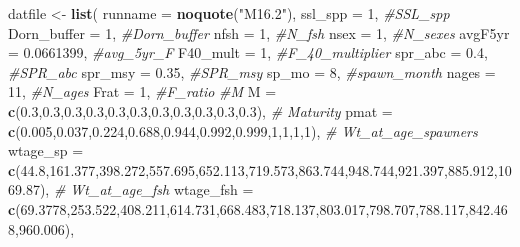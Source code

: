 \documentclass[]{article}
\newenvironment{Shaded}{\begin{snugshade}}{\end{snugshade}}
\newcommand{\CommentTok}[1]{\textcolor[rgb]{0.56,0.35,0.01}{\textit{#1}}}
\newcommand{\DataTypeTok}[1]{\textcolor[rgb]{0.13,0.29,0.53}{#1}}
\newcommand{\DecValTok}[1]{\textcolor[rgb]{0.00,0.00,0.81}{#1}}
\newcommand{\FloatTok}[1]{\textcolor[rgb]{0.00,0.00,0.81}{#1}}
\newcommand{\KeywordTok}[1]{\textcolor[rgb]{0.13,0.29,0.53}{\textbf{#1}}}
\newcommand{\NormalTok}[1]{#1}
\newcommand{\StringTok}[1]{\textcolor[rgb]{0.31,0.60,0.02}{#1}}
\begin{document}
\begin{Shaded}
\begin{Highlighting}[]
\NormalTok{datfile \textless{}{-}}\StringTok{ }\KeywordTok{list}\NormalTok{(}
  \DataTypeTok{runname     =} \KeywordTok{noquote}\NormalTok{(}\StringTok{"M16.2"}\NormalTok{), }
  \DataTypeTok{ssl\_spp     =} \DecValTok{1}\NormalTok{,         }\CommentTok{\#SSL\_spp}
  \DataTypeTok{Dorn\_buffer =} \DecValTok{1}\NormalTok{,         }\CommentTok{\#Dorn\_buffer}
  \DataTypeTok{nfsh        =} \DecValTok{1}\NormalTok{,         }\CommentTok{\#N\_fsh}
  \DataTypeTok{nsex        =} \DecValTok{1}\NormalTok{,         }\CommentTok{\#N\_sexes}
  \DataTypeTok{avgF5yr     =} \FloatTok{0.0661399}\NormalTok{, }\CommentTok{\#avg\_5yr\_F}
  \DataTypeTok{F40\_mult    =} \DecValTok{1}\NormalTok{,         }\CommentTok{\#F\_40\_multiplier}
  \DataTypeTok{spr\_abc     =} \FloatTok{0.4}\NormalTok{,       }\CommentTok{\#SPR\_abc}
  \DataTypeTok{spr\_msy     =} \FloatTok{0.35}\NormalTok{,      }\CommentTok{\#SPR\_msy}
  \DataTypeTok{sp\_mo       =} \DecValTok{8}\NormalTok{,         }\CommentTok{\#spawn\_month}
  \DataTypeTok{nages       =} \DecValTok{11}\NormalTok{,        }\CommentTok{\#N\_ages}
  \DataTypeTok{Frat        =} \DecValTok{1}\NormalTok{,         }\CommentTok{\#F\_ratio}
    \CommentTok{\#M}
    \DataTypeTok{M    =} \KeywordTok{c}\NormalTok{(}\FloatTok{0.3}\NormalTok{,}\FloatTok{0.3}\NormalTok{,}\FloatTok{0.3}\NormalTok{,}\FloatTok{0.3}\NormalTok{,}\FloatTok{0.3}\NormalTok{,}\FloatTok{0.3}\NormalTok{,}\FloatTok{0.3}\NormalTok{,}\FloatTok{0.3}\NormalTok{,}\FloatTok{0.3}\NormalTok{,}\FloatTok{0.3}\NormalTok{,}\FloatTok{0.3}\NormalTok{), }
    \CommentTok{\# Maturity}
    \DataTypeTok{pmat =} \KeywordTok{c}\NormalTok{(}\FloatTok{0.005}\NormalTok{,}\FloatTok{0.037}\NormalTok{,}\FloatTok{0.224}\NormalTok{,}\FloatTok{0.688}\NormalTok{,}\FloatTok{0.944}\NormalTok{,}\FloatTok{0.992}\NormalTok{,}\FloatTok{0.999}\NormalTok{,}\DecValTok{1}\NormalTok{,}\DecValTok{1}\NormalTok{,}\DecValTok{1}\NormalTok{,}\DecValTok{1}\NormalTok{),}
    \CommentTok{\# Wt\_at\_age\_spawners  }
    \DataTypeTok{wtage\_sp  =} \KeywordTok{c}\NormalTok{(}\FloatTok{44.8}\NormalTok{,}\FloatTok{161.377}\NormalTok{,}\FloatTok{398.272}\NormalTok{,}\FloatTok{557.695}\NormalTok{,}\FloatTok{652.113}\NormalTok{,}\FloatTok{719.573}\NormalTok{,}\FloatTok{863.744}\NormalTok{,}\FloatTok{948.744}\NormalTok{,}\FloatTok{921.397}\NormalTok{,}\FloatTok{885.912}\NormalTok{,}\FloatTok{1069.87}\NormalTok{),}
    \CommentTok{\# Wt\_at\_age\_fsh}
    \DataTypeTok{wtage\_fsh =} \KeywordTok{c}\NormalTok{(}\FloatTok{69.3778}\NormalTok{,}\FloatTok{253.522}\NormalTok{,}\FloatTok{408.211}\NormalTok{,}\FloatTok{614.731}\NormalTok{,}\FloatTok{668.483}\NormalTok{,}\FloatTok{718.137}\NormalTok{,}\FloatTok{803.017}\NormalTok{,}\FloatTok{798.707}\NormalTok{,}\FloatTok{788.117}\NormalTok{,}\FloatTok{842.468}\NormalTok{,}\FloatTok{960.006}\NormalTok{), }

\end{Highlighting}
\end{Shaded}
\end{document}
